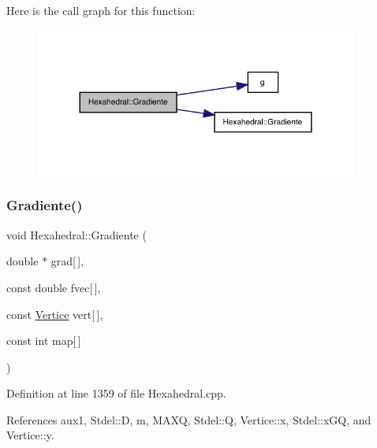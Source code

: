 Here is the call graph for this function\+:
\nopagebreak
\begin{figure}[H]
\begin{center}
\leavevmode
\includegraphics[width=300pt]{classHexahedral_a244f208541f6a22826ff5265445ff4d7_cgraph}
\end{center}
\end{figure}
\mbox{\label{classHexahedral_ad675fb552d1b36518636aaa3f93f7969}} 
\subsubsection{\texorpdfstring{Gradiente()}{Gradiente()}\hspace{0.1cm}{\footnotesize\ttfamily [3/6]}}
{\footnotesize\ttfamily void Hexahedral\+::\+Gradiente (\begin{DoxyParamCaption}\item[{double $\ast$}]{grad\mbox{[}$\,$\mbox{]},  }\item[{const double}]{fvec\mbox{[}$\,$\mbox{]},  }\item[{const \hyperlink{structVertice}{Vertice}}]{vert\mbox{[}$\,$\mbox{]},  }\item[{const int}]{map\mbox{[}$\,$\mbox{]} }\end{DoxyParamCaption})\hspace{0.3cm}{\ttfamily [virtual]}}



Definition at line 1359 of file Hexahedral.\+cpp.



References aux1, Stdel\+::D, m, M\+A\+XQ, Stdel\+::Q, Vertice\+::x, Stdel\+::x\+GQ, and Vertice\+::y.

\mbox{\label{classStdel_af3e65d1ad0d59ded925a3f5a9d0fb100}} 
